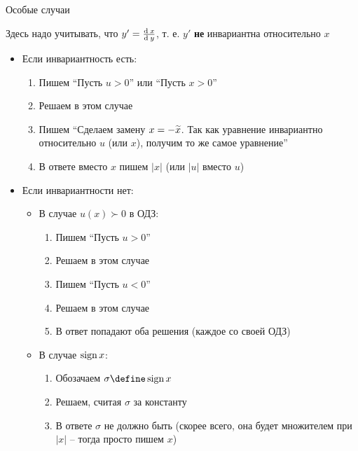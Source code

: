 \begin{undefthm}{Особые случаи}
\begin{enumerate}
\begin{enumerate}
\begin{note}
            \end{note}
            \begin{remark}
                Здесь надо учитывать, что $ y' = \frac{\operatorname{d}^{} x}{\operatorname{d}^{} y} $, т. е. $ y' $ \textbf{не} инвариантна относительно $ x $
            \end{remark}
            \begin{itemize}
            	\item Если инвариантность есть:
                \begin{enumerate}
                	\item Пишем ``Пусть $ u > 0 $'' или ``Пусть $ x > 0 $''
                    \item Решаем в этом случае
                    \item Пишем ``Сделаем замену $ x = -\widetilde{x} $. Так как уравнение инвариантно относительно $ u $ (или $ x $), получим то же самое уравнение''
                    \item В ответе вместо $ x $ пишем $ |x| $ (или $ |u| $ вместо $ u $)
                \end{enumerate}
                \item Если инвариантности нет:
                \begin{itemize}
                	\item В случае $ u(x) \succ 0 $ в ОДЗ:
                    \begin{enumerate}
                    	\item Пишем ``Пусть $ u > 0 $''
                        \item Решаем в этом случае
                        \item Пишем ``Пусть $ u < 0 $''
                        \item Решаем в этом случае
                        \item В ответ попадают оба решения (каждое со своей ОДЗ)
                    \end{enumerate}
                    \item В случае $ \operatorname{sign} x $:
                    \begin{enumerate}
                    	\item Обозачаем $ \sigma \define \sign x $
                        \item Решаем, считая $ \sigma $ за константу
                        \item В ответе $ \sigma $ не должно быть (скорее всего, она будет множителем при $ |x| $ -- тогда просто пишем $ x $)

\end{enumerate}
\end{itemize}
\end{itemize}
\end{enumerate}
\end{enumerate}
\end{undefthm}

